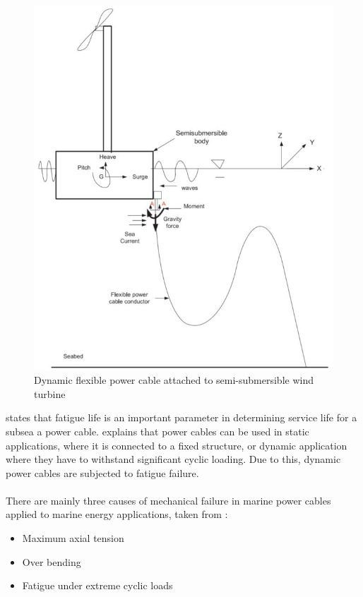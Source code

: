 \begin{figure}[H]
\centering
\includegraphics[scale=0.7]{figures/float}
\caption[$\; \:$Dynamic flexible power cable attached to semi-submersible wind turbine]{Dynamic flexible power cable attached to semi-submersible wind turbine \cite{Nasution2013}}
 \label{fig:float}
\end{figure}
\noindent \cite{YangShun-Han2017} states that fatigue life is an important parameter in determining service life for a subsea a power cable. \cite{Thies2012} explains that power cables can be used in static applications, where it is connected to a fixed structure, or dynamic application where they have to withstand significant cyclic loading. Due to this, dynamic power cables are subjected to fatigue failure.\\\\
There are mainly three causes of mechanical failure in marine power cables applied to marine energy applications, taken from \cite{Thies2012}:

\begin{itemize}
    \item Maximum axial tension
    \item Over bending
    \item Fatigue under extreme cyclic loads
\end{itemize}

